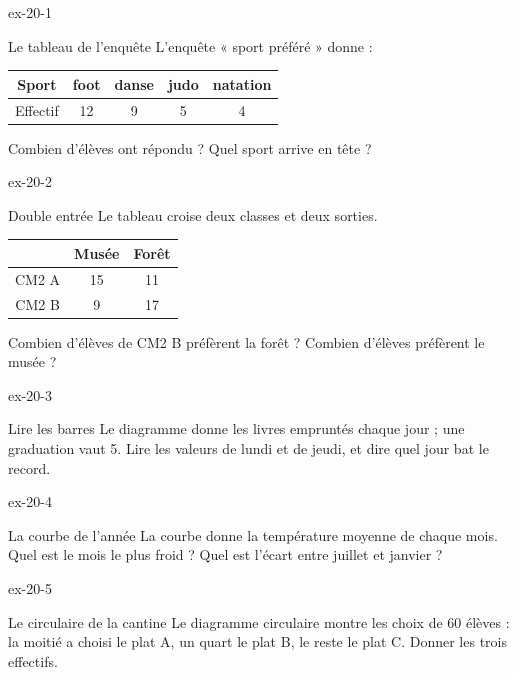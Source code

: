\clearpage{}
\begin{blocLivre}{ex-20-1}\begin{exercice}[1]{Le tableau de l’enquête}
L’enquête « sport préféré » donne :\begin{center}\renewcommand{\arraystretch}{1.35}\begin{tabular}{c|cccc}\toprule
Sport & foot & danse & judo & natation\\\midrule
Effectif & 12 & 9 & 5 & 4\\
\bottomrule\end{tabular}\end{center}Combien d’élèves ont répondu ? Quel sport arrive en tête ?
\end{exercice}\end{blocLivre}
\begin{blocLivre}{ex-20-2}\begin{exercice}[1]{Double entrée}
Le tableau croise deux classes et deux sorties.\begin{center}\renewcommand{\arraystretch}{1.35}\begin{tabular}{c|cc}\toprule
 & Musée & Forêt\\\midrule
CM2 A & 15 & 11\\
CM2 B & 9 & 17\\
\bottomrule\end{tabular}\end{center}Combien d’élèves de CM2 B préfèrent la forêt ? Combien d’élèves préfèrent le musée ?
\end{exercice}\end{blocLivre}
\begin{blocLivre}{ex-20-3}\begin{exercice}[1]{Lire les barres}
Le diagramme donne les livres empruntés chaque jour ; une graduation vaut 5. Lire les valeurs de lundi et de jeudi, et dire quel jour bat le record.
\label{fig-ex-20-3}
\end{exercice}\end{blocLivre}
\begin{blocLivre}{ex-20-4}\begin{exercice}[1]{La courbe de l’année}
La courbe donne la température moyenne de chaque mois. Quel est le mois le plus froid ? Quel est l’écart entre juillet et janvier ?
\label{fig-ex-20-4}
\end{exercice}\end{blocLivre}
\begin{blocLivre}{ex-20-5}\begin{exercice}[1]{Le circulaire de la cantine}
Le diagramme circulaire montre les choix de 60 élèves : la moitié a choisi le plat A, un quart le plat B, le reste le plat C. Donner les trois effectifs.
\label{fig-ex-20-5}
\end{exercice}\end{blocLivre}

